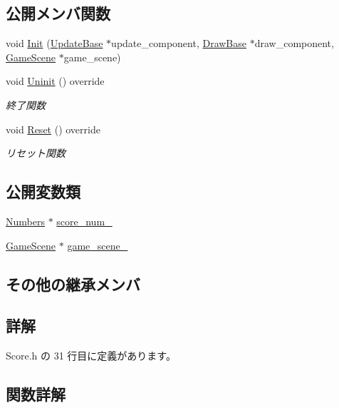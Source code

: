 \subsection*{公開メンバ関数}
\begin{DoxyCompactItemize}
\item 
void \mbox{\hyperlink{class_score_a7d461a8b72ddfd00213858286d702486}{Init}} (\mbox{\hyperlink{class_update_base}{Update\+Base}} $\ast$update\+\_\+component, \mbox{\hyperlink{class_draw_base}{Draw\+Base}} $\ast$draw\+\_\+component, \mbox{\hyperlink{class_game_scene}{Game\+Scene}} $\ast$game\+\_\+scene)
\item 
void \mbox{\hyperlink{class_score_a605e163dc59ccc4d19a3cb6b5db813b8}{Uninit}} () override
\begin{DoxyCompactList}\small\item\em 終了関数 \end{DoxyCompactList}\item 
void \mbox{\hyperlink{class_score_ad01d461a2b6ca345858b2ae0a3d81cc1}{Reset}} () override
\begin{DoxyCompactList}\small\item\em リセット関数 \end{DoxyCompactList}\end{DoxyCompactItemize}
\subsection*{公開変数類}
\begin{DoxyCompactItemize}
\item 
\mbox{\hyperlink{class_numbers}{Numbers}} $\ast$ \mbox{\hyperlink{class_score_a5d178c5581627f1fa4c06f95f9558dcd}{score\+\_\+num\+\_\+}}
\item 
\mbox{\hyperlink{class_game_scene}{Game\+Scene}} $\ast$ \mbox{\hyperlink{class_score_ada5a957b01fbed0c1bb52cea4e1bcbc4}{game\+\_\+scene\+\_\+}}
\end{DoxyCompactItemize}
\subsection*{その他の継承メンバ}


\subsection{詳解}


 Score.\+h の 31 行目に定義があります。



\subsection{関数詳解}
\mbox{\label{class_score_a7d461a8b72ddfd00213858286d702486}} 
